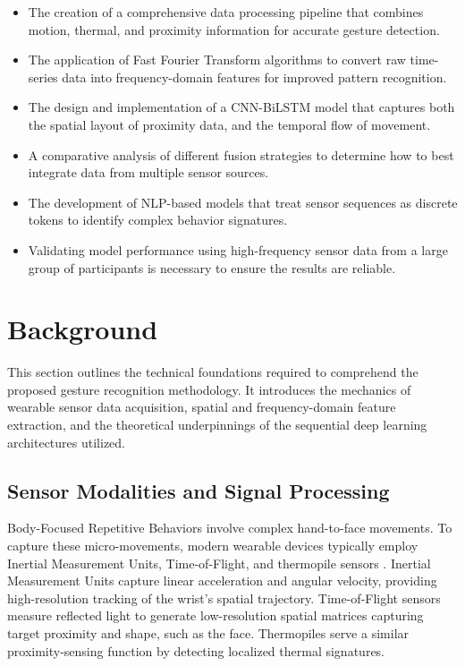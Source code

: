 \documentclass[conference]{IEEEtran}
\begin{document}
\begin{itemize}
\item The creation of a comprehensive data processing pipeline that combines motion, thermal, and proximity information for accurate gesture detection.
\item The application of Fast Fourier Transform algorithms to convert raw time-series data into frequency-domain features for improved pattern recognition.
\item The design and implementation of a CNN-BiLSTM model that captures both the spatial layout of proximity data, and the temporal flow of movement.
\item A comparative analysis of different fusion strategies to determine how to best integrate data from multiple sensor sources.
\item The development of NLP-based models that treat sensor sequences as discrete tokens to identify complex behavior signatures.
\item Validating model performance using high-frequency sensor data from a large group of participants is necessary to ensure the results are reliable.
\end{itemize}
\clearpage

\newpage
\section{Background}
\label{sec:background}

This section outlines the technical foundations required to comprehend the proposed gesture recognition methodology. It introduces the mechanics of wearable sensor data acquisition, spatial and frequency-domain feature extraction, and the theoretical underpinnings of the sequential deep learning architectures utilized.

\subsection{Sensor Modalities and Signal Processing}
Body-Focused Repetitive Behaviors involve complex hand-to-face movements. To capture these micro-movements, modern wearable devices typically employ Inertial Measurement Units, Time-of-Flight, and thermopile sensors \cite{ceva2019bno, melexis2023mlx, st2024vl53}. Inertial Measurement Units capture linear acceleration and angular velocity, providing high-resolution tracking of the wrist's spatial trajectory. Time-of-Flight sensors measure reflected light to generate low-resolution spatial matrices capturing target proximity and shape, such as the face. Thermopiles serve a similar proximity-sensing function by detecting localized thermal signatures.
\end{document}
